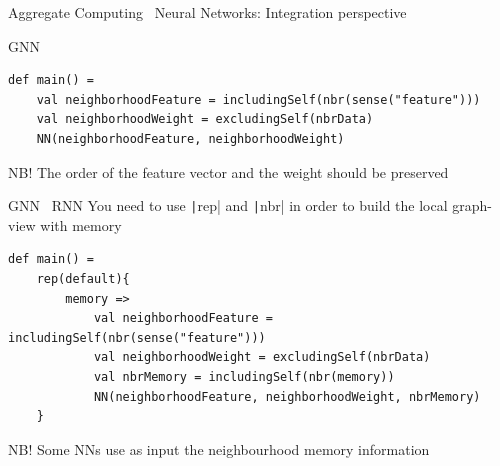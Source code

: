 \documentclass[presentation, 9pt]{beamer}\mode<presentation>{\usetheme{AMSBolognaFC}}
\begin{document}
\begin{frame}{Aggregate Computing \faPlus \, Neural Networks: Integration perspective}
\begin{alertblock}{GNN}
\begin{verbatim}
def main() = 
	val neighborhoodFeature = includingSelf(nbr(sense("feature")))
	val neighborhoodWeight = excludingSelf(nbrData)
	NN(neighborhoodFeature, neighborhoodWeight)
\end{verbatim}
NB! The order of the feature vector and the weight should be preserved
\end{alertblock}
\begin{alertblock}{GNN \faPlus \, RNN}
	You need to use \texttt|rep| and \texttt|nbr| in order to build the local graph-view with memory
\begin{verbatim}
def main() =
	rep(default){
		memory => 
			val neighborhoodFeature = includingSelf(nbr(sense("feature")))
			val neighborhoodWeight = excludingSelf(nbrData)
			val nbrMemory = includingSelf(nbr(memory))
			NN(neighborhoodFeature, neighborhoodWeight, nbrMemory)
	}
\end{verbatim}
NB! Some NNs use as input the neighbourhood memory information
\end{alertblock}
\end{frame}

\end{document}
